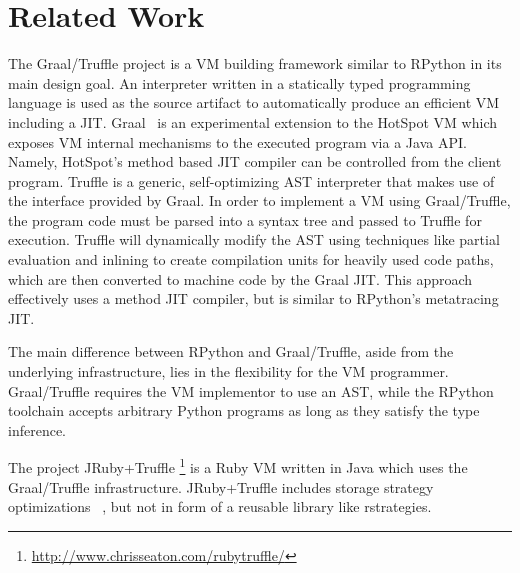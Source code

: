 \documentclass[english,10pt]{sigplanconf}
\begin{document}


\section{Related Work}


The Graal/Truffle project is a VM building framework similar to
RPython in its main design goal.  An interpreter written in a
statically typed programming language is used as the source artifact
to automatically produce an efficient VM including a JIT.
%
Graal~\cite{graal} is an experimental extension to the HotSpot VM
which exposes VM internal mechanisms to the executed program via a
Java API.  Namely, HotSpot's method based JIT compiler can be
controlled from the client program.  Truffle \cite{truffle} is a
generic, self-optimizing AST interpreter that makes use of the
interface provided by Graal.  In order to implement a VM using
Graal/Truffle, the program code must be parsed into a syntax tree and
passed to Truffle for execution.  Truffle will dynamically modify the
AST using techniques like partial evaluation and inlining to create
compilation units for heavily used code paths, which are then
converted to machine code by the Graal JIT.  This approach effectively
uses a method JIT compiler, but is similar to RPython's metatracing
JIT.

The main difference between RPython and Graal/Truffle, aside from the
underlying infrastructure, lies in the flexibility for the VM
programmer.  Graal/Truffle requires the VM implementor to use an AST,
while the RPython toolchain accepts arbitrary Python programs as long
as they satisfy the type inference.

The project JRuby+Truffle%
\footnote{\url{http://www.chrisseaton.com/rubytruffle/}} is a Ruby VM
written in Java which uses the Graal/Truffle infrastructure.
JRuby+Truffle includes storage strategy optimizations%
~\cite{smallDataStructures}, but not in form of a reusable library like
rstrategies.
\end{document}
